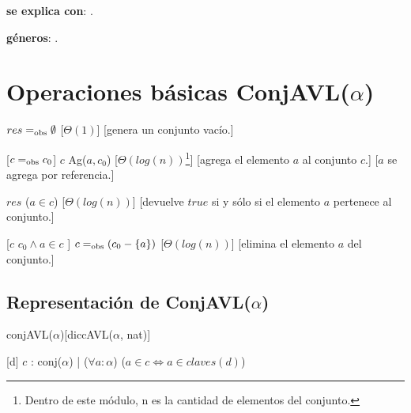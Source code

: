 \begin{Interfaz}

  \textbf{se explica con}: .

  \textbf{géneros}: .

  \section*{Operaciones básicas ConjAVL($\alpha$)}

  {$res =_{\mathrm{obs}} \emptyset$}
  [$\Theta(1)$]
  [genera un conjunto vacío.]

  [$c =_{\mathrm{obs}} c_0$]  
  {$c$ \igobs Ag($a,c_0$)}
  [$\Theta(log(n))$\footnote{Dentro de este módulo, n es la cantidad de elementos del conjunto.}]
  [agrega el elemento $a$ al conjunto $c$.]
  [$a$ se agrega por referencia.]
    
  {$res$ \igobs ($a\in c$) }
  [$\Theta(log(n))$]
  [devuelve $true$ si y sólo si el elemento $a$ pertenece al conjunto.]
  
  [$c$ \igobs $c_0 \land a \in c$ ]
  {$c =_{\mathrm{obs}} (c_0 - \{a\})$}
  [$\Theta(log(n))$]
  [elimina el elemento $a$ del conjunto.] 
  
\end{Interfaz}

\begin{Representacion}
    
  \section*{Representación de ConjAVL($\alpha$)}

  \begin{Estructura}{conjAVL($\alpha$)}[diccAVL($\alpha$, nat)]
  \end{Estructura}
  
  
  [d]{
	$c$ : conj($\alpha$) | ($\forall a: \alpha$) ($a\in c \Leftrightarrow a\in claves(d)$)}
\end{Representacion}


